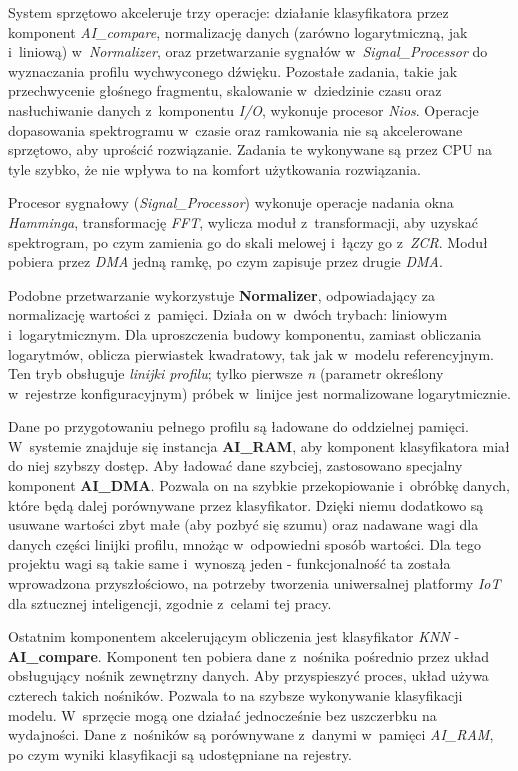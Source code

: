 System sprzętowo akceleruje trzy operacje: działanie klasyfikatora przez komponent \textit{AI\_compare}, normalizację danych (zarówno logarytmiczną, jak i~liniową) w~\textit{Normalizer}, oraz przetwarzanie sygnałów w~\textit{Signal\_Processor} do wyznaczania profilu wychwyconego dźwięku. Pozostałe zadania, takie jak przechwycenie głośnego fragmentu, skalowanie w~dziedzinie czasu oraz nasłuchiwanie danych z~komponentu \textit{I/O}, wykonuje procesor \textit{Nios}. Operacje dopasowania spektrogramu w~czasie oraz ramkowania nie są akcelerowane sprzętowo, aby uprościć rozwiązanie. Zadania te wykonywane są przez CPU na tyle szybko, że nie wpływa to na komfort użytkowania rozwiązania.

Procesor sygnałowy (\textit{Signal\_Processor}) wykonuje operacje nadania okna \textit{Hamminga}, transformację \textit{FFT}, wylicza moduł z~transformacji, aby uzyskać spektrogram, po czym zamienia go do skali melowej i~łączy go z~\textit{ZCR}. Moduł pobiera przez \textit{DMA} jedną ramkę, po czym zapisuje przez drugie \textit{DMA}.

Podobne przetwarzanie wykorzystuje \textbf{Normalizer}, odpowiadający za normalizację wartości z~pamięci. Działa on w~dwóch trybach: liniowym i~logarytmicznym. Dla uproszczenia budowy komponentu, zamiast obliczania logarytmów, oblicza pierwiastek kwadratowy, tak jak w~modelu referencyjnym. Ten tryb obsługuje \textit{linijki profilu}; tylko pierwsze \textit{n} (parametr określony w~rejestrze konfiguracyjnym) próbek w~linijce jest normalizowane logarytmicznie.

Dane po przygotowaniu pełnego profilu są ładowane do oddzielnej pamięci. W~systemie znajduje się instancja \textbf{AI\_RAM}, aby komponent klasyfikatora miał do niej szybszy dostęp. Aby ładować dane szybciej, zastosowano specjalny komponent \textbf{AI\_DMA}. Pozwala on na szybkie przekopiowanie i~obróbkę danych, które będą dalej porównywane przez klasyfikator. Dzięki niemu dodatkowo są usuwane wartości zbyt małe (aby pozbyć się szumu) oraz nadawane wagi dla danych części linijki profilu, mnożąc w~odpowiedni sposób wartości. Dla tego projektu wagi są takie same i~wynoszą jeden - funkcjonalność ta została wprowadzona przyszłościowo, na potrzeby tworzenia uniwersalnej platformy \textit{IoT} dla sztucznej inteligencji, zgodnie z~celami tej pracy.

Ostatnim komponentem akcelerującym obliczenia jest klasyfikator \textit{KNN} - \textbf{AI\_compare}. Komponent ten pobiera dane z~nośnika pośrednio przez układ obsługujący nośnik zewnętrzny danych. Aby przyspieszyć proces, układ używa czterech takich nośników. Pozwala to na szybsze wykonywanie klasyfikacji modelu. W~sprzęcie mogą one działać jednocześnie bez uszczerbku na wydajności. Dane z~nośników są porównywane z~danymi w~pamięci \textit{AI\_RAM}, po czym wyniki klasyfikacji są udostępniane na rejestry.

